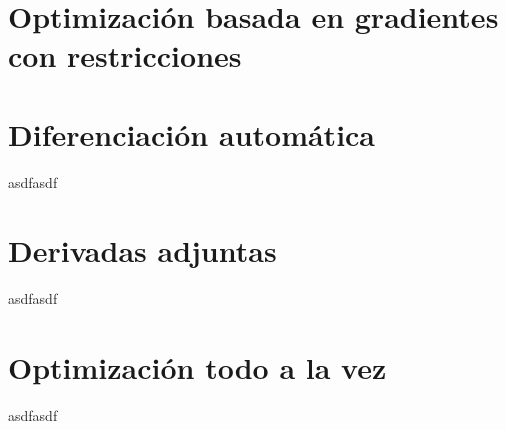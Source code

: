 \section{Optimización basada en gradientes con restricciones}


\section{Diferenciación automática}
asdfasdf

\section{Derivadas adjuntas}
\label{sec:adjoints}
asdfasdf

\section{Optimización todo a la vez}
asdfasdf
